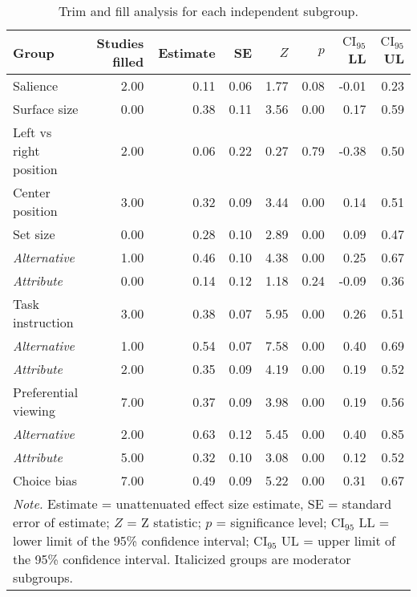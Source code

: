 \begin{table}[ht]
\centering
\caption{Trim and fill analysis for each independent subgroup.} 
\label{tab:trim_fill_results}
\begin{tabular}{lrrrrrrr}
  \hline
Group & Studies filled & Estimate & SE & $Z$ & $p$ & $\textrm{CI}_{95}$ LL & $\textrm{CI}_{95}$ UL \\ 
  \hline
Salience & 2.00 & 0.11 & 0.06 & 1.77 & 0.08 & -0.01 & 0.23 \\ 
  Surface size & 0.00 & 0.38 & 0.11 & 3.56 & 0.00 & 0.17 & 0.59 \\ 
  Left vs right position & 2.00 & 0.06 & 0.22 & 0.27 & 0.79 & -0.38 & 0.50 \\ 
  Center position & 3.00 & 0.32 & 0.09 & 3.44 & 0.00 & 0.14 & 0.51 \\ 
  Set size & 0.00 & 0.28 & 0.10 & 2.89 & 0.00 & 0.09 & 0.47 \\ 
  \textit{Alternative} & 1.00 & 0.46 & 0.10 & 4.38 & 0.00 & 0.25 & 0.67 \\ 
  \textit{Attribute} & 0.00 & 0.14 & 0.12 & 1.18 & 0.24 & -0.09 & 0.36 \\ 
  Task instruction & 3.00 & 0.38 & 0.07 & 5.95 & 0.00 & 0.26 & 0.51 \\ 
  \textit{Alternative} & 1.00 & 0.54 & 0.07 & 7.58 & 0.00 & 0.40 & 0.69 \\ 
  \textit{Attribute} & 2.00 & 0.35 & 0.09 & 4.19 & 0.00 & 0.19 & 0.52 \\ 
  Preferential viewing & 7.00 & 0.37 & 0.09 & 3.98 & 0.00 & 0.19 & 0.56 \\ 
  \textit{Alternative} & 2.00 & 0.63 & 0.12 & 5.45 & 0.00 & 0.40 & 0.85 \\ 
  \textit{Attribute} & 5.00 & 0.32 & 0.10 & 3.08 & 0.00 & 0.12 & 0.52 \\ 
  Choice bias & 7.00 & 0.49 & 0.09 & 5.22 & 0.00 & 0.31 & 0.67 \\ 
   \hline 
 \multicolumn{8}{p{0.9\textwidth}}{\scriptsize{\textit{Note.} Estimate = unattenuated effect size estimate, SE = standard error of estimate; $Z$ = Z statistic; $p$ = significance level; $\textrm{CI}_{95}$ LL = lower limit of the 95\% confidence interval; $\textrm{CI}_{95}$ UL = upper limit of the 95\% confidence interval. Italicized groups are moderator subgroups.}} 
\end{tabular}
\end{table}
